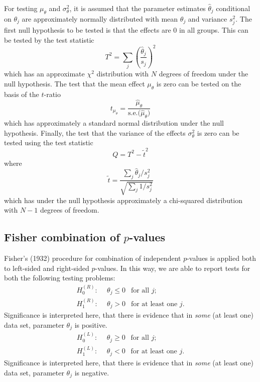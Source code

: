 \documentclass[a4paper,12pt,fleqn]{article}
\renewcommand{\th}[1]{$\theta_{#1}$}
\begin{document}
For testing $\mu_\theta$ and $\sigma^2_\theta$,
it is assumed that the parameter estimates ${\hat{\theta}}_j$
conditional on $\theta_j$
are approximately normally distributed with mean \th{j} and variance $s^2_j$.
The first null hypothesis to be tested is that the effects are 0 in all groups.
This can be tested by the test statistic
\begin{equation}
 T^2 = \sum_j \left( \frac{{\hat{\theta}}_j}{s_j} \right)^2     \label{T^2}
\end{equation}
which has an approximate $\chi^2$ distribution with $N$ degrees of freedom
under the null hypothesis.
The test that the mean effect $\mu_\theta$ is zero can be tested
on the basis of the $t$-ratio
\begin{equation}
 t_{\mu_\theta} =   \frac{{\hat{\mu}}_\theta}
                    { \mbox{s.e.}\big( {\hat{\mu}}_\theta \big) }
\end{equation}
which has approximately a standard normal distribution
under the null hypothesis.
Finally, the test that the variance of the effects $\sigma^2_\theta$ is zero
can be tested using the test statistic
\begin{equation}
 Q = T^2 - {\tilde{t}}^2                                  \label{Q}
\end{equation}
where
\begin{equation}
 \tilde{t} = \frac{\sum_j {\hat{\theta}}_j / s^2_j }
                  {  \sqrt{ \sum_j 1/s^2_j  } }         \label{ttilde}
\end{equation}
which has under the null hypothesis approximately a chi-squared distribution
with $N-1$ degrees of freedom.

\subsection{Fisher combination of $p$-values}
Fisher's (1932) procedure for combination of independent $p$-values
is applied both to left-sided and right-sided $p$-values. In this way,
we are able to report tests for both the following testing problems:
\begin{align*}
 H_0^{(R)}: \ \ & \theta_j \leq 0 \ \ \mbox{ for all } j; \\
 H_1^{(R)}: \ \ & \theta_j > 0 \ \ \mbox{ for at least one } j .
\end{align*}
Significance is interpreted here,
that there is evidence that in \emph{some} (at least one) data set,
parameter $\theta_j$ is positive.
\begin{align*}
 H_0^{(L)}:\ \ & \theta_j \geq 0 \ \ \mbox{ for all } j; \\
 H_1^{(L)}:\ \ & \theta_j < 0 \ \ \mbox{ for at least one } j .
\end{align*}
Significance is interpreted here,
that there is evidence that in \emph{some} (at least one) data set,
parameter $\theta_j$ is negative.
\end{document}
